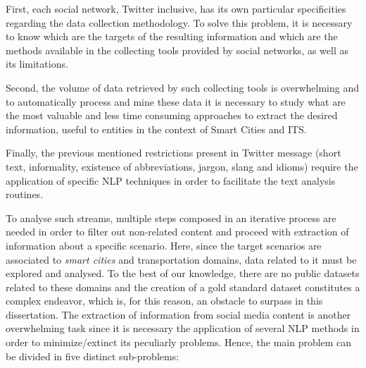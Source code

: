First, each social network, Twitter inclusive, has its own particular specificities regarding the data collection methodology. To solve this problem, it is necessary to know which are the targets of the resulting information and which are the methods available in the collecting tools provided by social networks, as well as its limitations.

Second, the volume of data retrieved by such collecting tools is overwhelming and to automatically process and mine these data it is necessary to study what are the most valuable and less time consuming approaches to extract the desired information, useful to entities in the context of Smart Cities and \gls{ITS}.

Finally, the previous mentioned restrictions present in Twitter message (short text, informality, existence of abbreviations, jargon, slang and idioms) require the application of specific \gls{NLP} techniques in order to facilitate the text analysis routines.
\fi

\iffalse
To analyse such streams, multiple steps composed in an iterative process are needed in order to filter out non-related content and proceed with extraction of information about a specific scenario. Here, since the target scenarios are associated to \textit{smart cities} and transportation domains, data related to it must be explored and analysed. To the best of our knowledge, there are no public datasets related to these domains and the creation of a gold standard dataset constitutes a complex endeavor, which is, for this reason, an obstacle to surpass in this dissertation. The extraction of information from social media content is another overwhelming task since it is necessary the application of several \gls{NLP} methods in order to minimize/extinct its peculiarly problems. Hence, the main problem can be divided in five distinct sub-problems:

